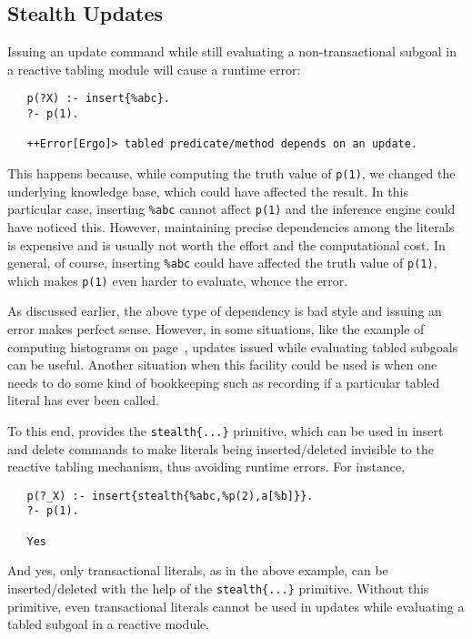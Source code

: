 
\subsection{Stealth Updates}\label{sec-stealth-updates}

Issuing an update command while still evaluating a non-transactional
subgoal in a reactive tabling module will cause a runtime error:
\begin{verbatim}
   p(?X) :- insert{%abc}.
   ?- p(1).

   ++Error[Ergo]> tabled predicate/method depends on an update.
\end{verbatim}
This happens because, while computing the truth value of \texttt{p(1)}, we
changed the underlying knowledge base, which could have affected the result.
In this particular case, inserting \texttt{\%abc} cannot affect \texttt{p(1)}
and the inference engine could have noticed this. However, maintaining
precise dependencies among the literals is expensive and is usually not
worth the effort and the computational cost. In general, of course, inserting \texttt{\%abc} could have affected
the truth value of \texttt{p(1)}, which makes \texttt{p(1)} even harder to
evaluate, whence the error.

As discussed earlier, the above type of dependency is bad style and
issuing an error makes perfect sense. However, in some situations, like
the example of computing histograms on page~\pageref{page-histogram},
updates issued while evaluating tabled subgoals can be useful.
Another situation when this facility could be used is when one needs to do
some kind of bookkeeping such as recording if a particular tabled literal
has ever been called.

To this end, \ERGO provides the \texttt{stealth\{...\}} primitive, which
can be used in insert and delete commands to make literals being
inserted/deleted invisible to the reactive tabling mechanism, thus
avoiding runtime errors. For instance,
\begin{verbatim}
   p(?_X) :- insert{stealth{%abc,%p(2),a[%b]}}.
   ?- p(1).

   Yes
\end{verbatim}
And yes, only transactional literals, as in the above example, can be
inserted/deleted with the help of the \texttt{stealth\{...\}} primitive. 
Without this primitive, even transactional literals cannot be used in updates
while evaluating a tabled subgoal in a reactive module.

